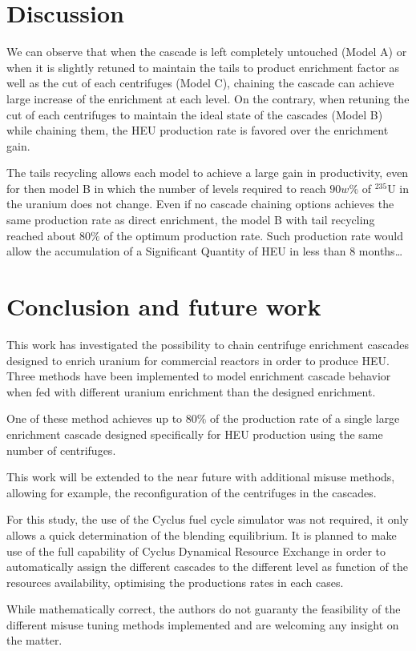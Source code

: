 \section{Discussion}

We can observe that when the cascade is left completely untouched (Model A) or
when it is slightly retuned to maintain the tails to product enrichment factor
as well as the cut of each centrifuges (Model C), chaining the cascade can
achieve large increase of the enrichment at each level.  On the contrary, when
retuning the cut of each centrifuges to maintain the ideal state of the cascades
(Model B) while chaining them, the \gls{HEU} production rate is favored over the
enrichment gain.

The tails recycling allows each model to achieve a large gain in productivity,
even for then model B in which the number of levels required to reach $90w\%$ of
$^{235}$U in the uranium does not change. Even if no cascade chaining options
achieves the same production rate as direct enrichment, the model B with tail
recycling reached about $80\%$ of the optimum production rate. Such production
rate would allow the accumulation of a Significant Quantity of \gls{HEU} in less
than 8 months\ldots


\section{Conclusion and future work}

This work has investigated the possibility to chain centrifuge enrichment
cascades designed to enrich uranium for commercial reactors in order to
produce \gls{HEU}. Three methods have been implemented to model enrichment
cascade behavior when fed with different uranium enrichment than the designed
enrichment. 

One of these method achieves up to $80\%$ of the production rate of a single
large enrichment cascade designed specifically for \gls{HEU} production using
the same number of centrifuges.

This work will be extended to the near future with additional misuse methods,
allowing for example, the reconfiguration of the centrifuges in the cascades.

For this study, the use of the Cyclus fuel cycle simulator was not
required, it only allows a quick determination of the blending equilibrium. It
is planned to make use of the full capability of Cyclus Dynamical Resource Exchange 
in order to automatically assign the different cascades to the different level
as function of the resources availability, optimising the productions rates in
each cases.

While mathematically correct, the authors do not guaranty the feasibility of the
different misuse tuning methods implemented and are welcoming any insight on the
matter.



